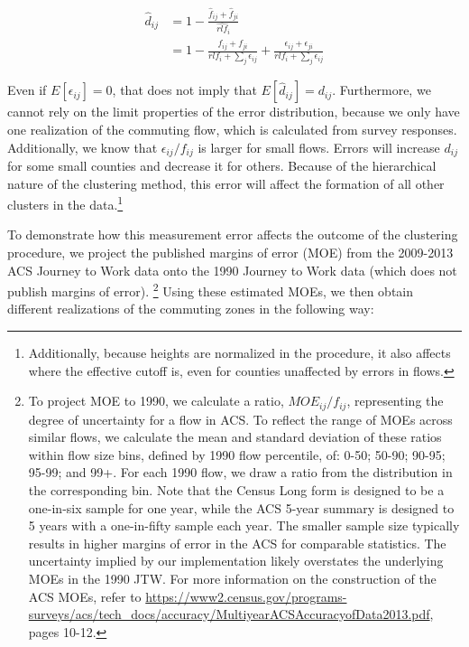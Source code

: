 \begin{align*}
\hat{d}_{ij} &= 1 - \frac{\hat{f}_{ij} + \hat{f}_{ji}}{\hat{rlf}_i} \\
&= 1- \frac{f_{ij} + f_{ji}}{rlf_{i} + \sum_j \epsilon_{ij}} +  \frac{\epsilon_{ij} + \epsilon_{ji}}{rlf_{i} + \sum_j \epsilon_{ij}}
\end{align*}

Even if $E[\epsilon_{ij}]=0$, that does not imply that $E[\hat{d}_{ij}] = d_{ij}$. Furthermore, we cannot rely on the limit properties of the error distribution, because we only have one realization of the commuting flow, which is calculated from survey responses. Additionally, we know that $\epsilon_{ij}/f_{ij}$ is larger for small flows. Errors will increase $d_{ij}$ for some small counties and decrease it for others. Because of the hierarchical nature of the clustering method, this error will affect the formation of all other clusters in the data.\footnote{Additionally, because heights are normalized in the procedure, it also affects where the effective cutoff is, even for counties unaffected by errors in flows.}

To demonstrate how this measurement error affects the outcome of the clustering procedure, we project the published margins of error (MOE) from the 2009-2013 ACS Journey to Work data onto the 1990 Journey to Work data (which does not publish margins of error). \footnote{To project MOE to 1990, we calculate a ratio, $MOE_{ij}/f_{ij}$, representing the degree of uncertainty for a flow in ACS. To reflect the range of MOEs across similar flows, we calculate the mean and standard deviation of these ratios within flow size bins, defined by 1990 flow percentile, of: 0-50; 50-90; 90-95; 95-99; and 99+. For each 1990 flow, we draw a ratio from the distribution in the corresponding bin. Note that the Census Long form is designed to be a one-in-six sample for one year, while the ACS 5-year summary is designed to 5 years with a one-in-fifty sample each year. The smaller sample size typically results in higher margins of error in the ACS for comparable statistics. The uncertainty implied by our implementation likely overstates the underlying MOEs in the 1990 JTW. For more information on the construction of the ACS MOEs, refer to \url{https://www2.census.gov/programs-surveys/acs/tech_docs/accuracy/MultiyearACSAccuracyofData2013.pdf}, pages 10-12.} Using these estimated MOEs, we then obtain different realizations of the commuting zones in the following way:

